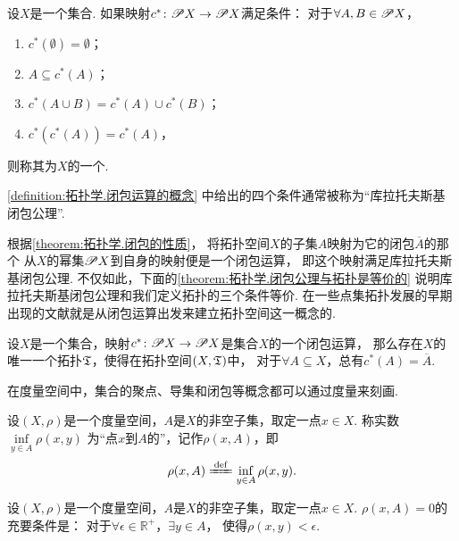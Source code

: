 \begin{definition}\label{definition:拓扑学.闭包运算的概念}
设\(X\)是一个集合.
如果映射\(c^*\colon \mathscr{P} X \to \mathscr{P} X\)满足条件：
对于\(\forall A,B \in \mathscr{P} X\)，\begin{enumerate}
	\item \(c^*(\emptyset) = \emptyset\)；
	\item \(A \subseteq c^*(A)\)；
	\item \(c^*(A \cup B) = c^*(A) \cup c^*(B)\)；
	\item \(c^*(c^*(A)) = c^*(A)\)，
\end{enumerate}
则称其为\(X\)的一个.
\end{definition}
\cref{definition:拓扑学.闭包运算的概念} 中给出的四个条件通常被称为“库拉托夫斯基闭包公理”.

根据\cref{theorem:拓扑学.闭包的性质}，
将拓扑空间\(X\)的子集\(A\)映射为它的闭包\(\overline{A}\)的那个
从\(X\)的幂集\(\mathscr{P} X\)到自身的映射便是一个闭包运算，
即这个映射满足库拉托夫斯基闭包公理.
不仅如此，下面的\cref{theorem:拓扑学.闭包公理与拓扑是等价的}
说明库拉托夫斯基闭包公理和我们定义拓扑的三个条件等价.
在一些点集拓扑发展的早期出现的文献就是从闭包运算出发来建立拓扑空间这一概念的.

\begin{theorem}\label{theorem:拓扑学.闭包公理与拓扑是等价的}
设\(X\)是一个集合，映射\(c^*\colon \mathscr{P} X \to \mathscr{P} X\)是集合\(X\)的一个闭包运算，
那么存在\(X\)的唯一一个拓扑\(\mathfrak T\)，使得在拓扑空间\((X,\mathfrak T)\)中，
对于\(\forall A \subseteq X\)，总有\(c^*(A) = \overline{A}\).
\end{theorem}

在度量空间中，集合的聚点、导集和闭包等概念都可以通过度量来刻画.

\begin{definition}\label{definition:拓扑学.点到点集的距离}
\def\d{\inf\limits_{y \in A} \rho(x,y)}%
设\((X,\rho)\)是一个度量空间，\(A\)是\(X\)的非空子集，取定一点\(x \in X\).
称实数\(\d\)
为“点\(x\)到\(A\)的”，记作\(\rho(x,A)\)，即\[
\rho(x,A) \defeq \d.
\]
\end{definition}

\begin{theorem}
设\((X,\rho)\)是一个度量空间，\(A\)是\(X\)的非空子集，取定一点\(x \in X\).
\(\rho(x,A) = 0\)的充要条件是：
对于\(\forall\epsilon\in\mathbb{R}^+\)，\(\exists y \in A\)，
使得\(\rho(x,y)<\epsilon\).
\end{theorem}

